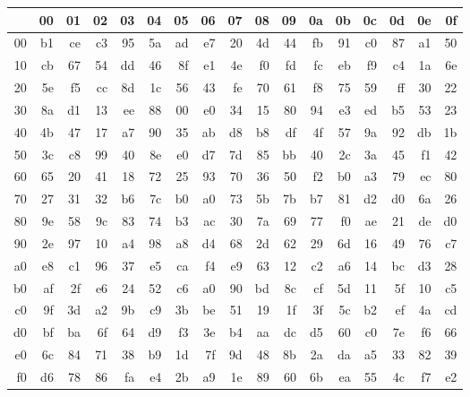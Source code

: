 \begin{tabular}{|r||r|r|r|r|r|r|r|r|r|r|r|r|r|r|r|r|}
  \hline
     & 00 & 01 & 02 & 03 & 04 & 05 & 06 & 07 & 08 & 09 & 0a & 0b & 0c & 0d & 0e & 0f \\
  \hline  \hline
  00 & b1 & ce & c3 & 95 & 5a & ad & e7 & 20 & 4d & 44 & fb & 91 & c0 & 87 & a1 & 50 \\
  \hline
  10 & cb & 67 & 54 & dd & 46 & 8f & e1 & 4e & f0 & fd & fc & eb & f9 & c4 & 1a & 6e \\
  \hline
  20 & 5e & f5 & cc & 8d & 1c & 56 & 43 & fe & 70 & 61 & f8 & 75 & 59 & ff & 30 & 22 \\
  \hline
  30 & 8a & d1 & 13 & ee & 88 & 00 & e0 & 34 & 15 & 80 & 94 & e3 & ed & b5 & 53 & 23 \\
  \hline
  40 & 4b & 47 & 17 & a7 & 90 & 35 & ab & d8 & b8 & df & 4f & 57 & 9a & 92 & db & 1b \\
  \hline
  50 & 3c & c8 & 99 & 40 & 8e & e0 & d7 & 7d & 85 & bb & 40 & 2c & 3a & 45 & f1 & 42 \\
  \hline
  60 & 65 & 20 & 41 & 18 & 72 & 25 & 93 & 70 & 36 & 50 & f2 & b0 & a3 & 79 & ec & 80 \\
  \hline
  70 & 27 & 31 & 32 & b6 & 7c & b0 & a0 & 73 & 5b & 7b & b7 & 81 & d2 & d0 & 6a & 26 \\
  \hline
  80 & 9e & 58 & 9c & 83 & 74 & b3 & ac & 30 & 7a & 69 & 77 & f0 & ae & 21 & de & d0 \\
  \hline
  90 & 2e & 97 & 10 & a4 & 98 & a8 & d4 & 68 & 2d & 62 & 29 & 6d & 16 & 49 & 76 & c7 \\
  \hline
  a0 & e8 & c1 & 96 & 37 & e5 & ca & f4 & e9 & 63 & 12 & c2 & a6 & 14 & bc & d3 & 28 \\
  \hline
  b0 & af & 2f & e6 & 24 & 52 & c6 & a0 & 90 & bd & 8c & cf & 5d & 11 & 5f & 10 & c5 \\
  \hline
  c0 & 9f & 3d & a2 & 9b & c9 & 3b & be & 51 & 19 & 1f & 3f & 5c & b2 & ef & 4a & cd \\
  \hline
  d0 & bf & ba & 6f & 64 & d9 & f3 & 3e & b4 & aa & dc & d5 & 60 & c0 & 7e & f6 & 66 \\
  \hline
  e0 & 6c & 84 & 71 & 38 & b9 & 1d & 7f & 9d & 48 & 8b & 2a & da & a5 & 33 & 82 & 39 \\
  \hline
  f0 & d6 & 78 & 86 & fa & e4 & 2b & a9 & 1e & 89 & 60 & 6b & ea & 55 & 4c & f7 & e2 \\
  \hline
\end{tabular}